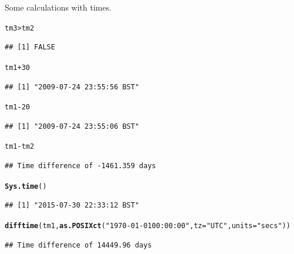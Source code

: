 \documentclass[12pt, a4paper, oneside]{article}\usepackage[]{graphicx}\usepackage[]{color}
\makeatletter
\newcommand{\hlnum}[1]{\textcolor[rgb]{0.686,0.059,0.569}{#1}}%
\newcommand{\hlstr}[1]{\textcolor[rgb]{0.192,0.494,0.8}{#1}}%
\newcommand{\hlopt}[1]{\textcolor[rgb]{0,0,0}{#1}}%
\newcommand{\hlstd}[1]{\textcolor[rgb]{0.345,0.345,0.345}{#1}}%
\newcommand{\hlkwc}[1]{\textcolor[rgb]{0.333,0.667,0.333}{#1}}%
\newcommand{\hlkwd}[1]{\textcolor[rgb]{0.737,0.353,0.396}{\textbf{#1}}}%
\newenvironment{kframe}{%
 \def\at@end@of@kframe{}%
 \ifinner\ifhmode%
  \def\at@end@of@kframe{\end{minipage}}%
  \begin{minipage}{\columnwidth}%
 \fi\fi%
 \def\FrameCommand##1{\hskip\@totalleftmargin \hskip-\fboxsep
 \colorbox{shadecolor}{##1}\hskip-\fboxsep
     \hskip-\linewidth \hskip-\@totalleftmargin \hskip\columnwidth}%
 \MakeFramed {\advance\hsize-\width
   \@totalleftmargin\z@ \linewidth\hsize
   \@setminipage}}%
 {\par\unskip\endMakeFramed%
 \at@end@of@kframe}
\newenvironment{knitrout}{}{} %
\makeatother
\begin{document}
Some calculations with times. 
\begin{knitrout}
\color{fgcolor}\begin{kframe}
\begin{alltt}
\hlstd{tm3} \hlopt{>} \hlstd{tm2}
\end{alltt}
\begin{verbatim}
## [1] FALSE
\end{verbatim}
\begin{alltt}
\hlstd{tm1} \hlopt{+} \hlnum{30}
\end{alltt}
\begin{verbatim}
## [1] "2009-07-24 23:55:56 BST"
\end{verbatim}
\begin{alltt}
\hlstd{tm1} \hlopt{-} \hlnum{20}
\end{alltt}
\begin{verbatim}
## [1] "2009-07-24 23:55:06 BST"
\end{verbatim}
\begin{alltt}
\hlstd{tm1} \hlopt{-} \hlstd{tm2}
\end{alltt}
\begin{verbatim}
## Time difference of -1461.359 days
\end{verbatim}
\begin{alltt}
\hlkwd{Sys.time}\hlstd{()}
\end{alltt}
\begin{verbatim}
## [1] "2015-07-30 22:33:12 BST"
\end{verbatim}
\begin{alltt}
\hlkwd{difftime}\hlstd{(tm1,} \hlkwd{as.POSIXct}\hlstd{(}\hlstr{"1970-01-01 00:00:00"}\hlstd{,} \hlkwc{tz} \hlstd{=} \hlstr{"UTC"}\hlstd{,} \hlkwc{units} \hlstd{=} \hlstr{"secs"}\hlstd{))}
\end{alltt}
\begin{verbatim}
## Time difference of 14449.96 days
\end{verbatim}
\end{kframe}
\end{knitrout}
\end{document}

